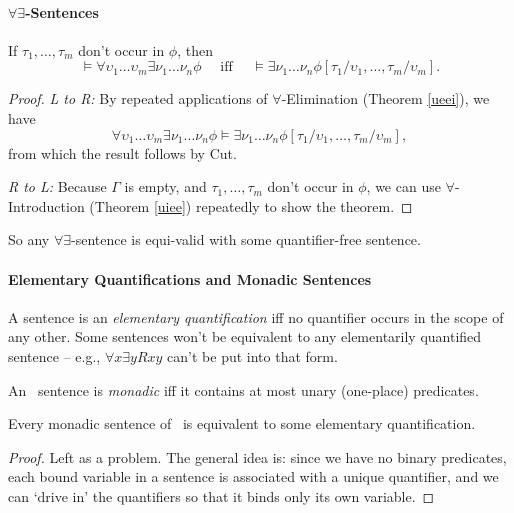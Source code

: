 \paragraph{$\forall\exists$-Sentences}

\begin{theorem}
	If $\tau_{1},\ldots,\tau_{m}$ don't occur in $\phi$, then $$\vDash \forall \upsilon_{1}\ldots\upsilon_{m}\exists\nu_{1}\ldots\nu_{n}\phi \quad\text{ iff }\quad \vDash\exists\nu_{1}\ldots\nu_{n}\phi[\tau_{1}/\upsilon_{1},\ldots,\tau_{m}/\upsilon_{m}].$$ \begin{proof} 
		{\emph{L to R:} By repeated applications of $\forall$-Elimination (Theorem \ref{ueei}), we have \begin{equation*}
			\forall \upsilon_{1}\ldots\upsilon_{m}\exists\nu_{1}\ldots\nu_{n}\phi \vDash \exists\nu_{1}\ldots\nu_{n}\phi[\tau_{1}/\upsilon_{1},\ldots,\tau_{m}/\upsilon_{m}],
		\end{equation*}from which the result follows by Cut.
		
		\emph{R to L:} Because $\Gamma$ is empty, and $\tau_{1},\ldots,\tau_{m}$ don't occur in $\phi$, we can use $\forall$-Introduction (Theorem \ref{uiee}) repeatedly to show the theorem.}
	\end{proof}
\end{theorem}
So any $\forall\exists$-sentence is equi-valid with some quantifier-free sentence.

\paragraph{Elementary Quantifications and Monadic Sentences}

A sentence is an \emph{elementary quantification} iff no quantifier occurs in the scope of any other. Some sentences won't be equivalent to any elementarily quantified sentence – e.g., $\forall x\exists y Rxy$ can't be put into that form.

An \ltwo\ sentence is \emph{monadic} iff it contains at most unary (one-place) predicates.

\begin{lemma}
	Every monadic sentence of \ltwo\ is equivalent to some elementary quantification. \begin{proof}
		Left as a problem. The general idea is: since we have no binary predicates, each bound variable in a sentence is associated with a unique quantifier, and we can `drive in' the quantifiers so that it binds only its own variable.
	\end{proof}
\end{lemma}

